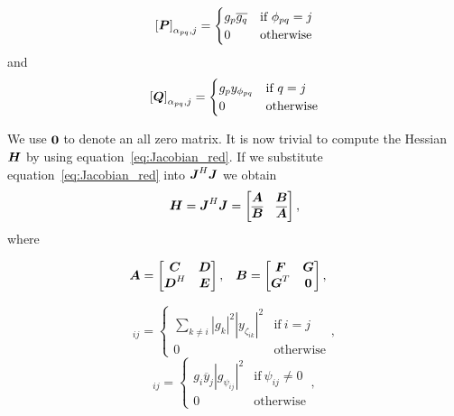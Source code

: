 \documentclass[useAMS,usenatbib]{mn2e}
\newcommand{\bA}{\bmath{A}}
\newcommand{\bB}{\bmath{B}}
\newcommand{\bC}{\bmath{C}}
\newcommand{\bE}{\bmath{E}}
\newcommand{\bF}{\bmath{F}}
\newcommand{\bG}{\bmath{G}}
\newcommand{\bJ}{\bmath{J}}
\newcommand{\bD}{\bmath{D}}
\newcommand{\bH}{\bmath{H}}
\newcommand{\bP}{\bmath{P}}
\newcommand{\bQ}{\bmath{Q}}
\newcommand{\bzero}{\bmath{0}}
\newcommand{\conj}[1]{\overline{#1}}
\begin{document}
\begin{equation}
\left [ \bP  \right ]_{\alpha_{pq},j} = \begin{cases}
                                         g_p\conj{g_q} & \textrm{if}~\phi_{pq}=j\\
                                         0  & \textrm{otherwise} 
                                        \end{cases}
\end{equation}
and
\begin{equation}
\left [ \bQ  \right ]_{\alpha_{pq},j} = \begin{cases}
                                         g_py_{\phi_{pq}} & \textrm{if}~q=j\\
                                         0  & \textrm{otherwise} 
                                        \end{cases}
\end{equation}

We use $\bzero$ to denote an all zero matrix. It is now trivial to compute the Hessian $\bH$ by using equation~\ref{eq:Jacobian_red}. If we substitute equation~\ref{eq:Jacobian_red} into $\bJ^H\bJ$
we obtain 
\begin{equation}
\label{eq:red_H}
\bH = \bJ^H\bJ = 
\begin{bmatrix}
\bA & \bB\\
\conj{\bB} & \conj{\bA}
\end{bmatrix},
\end{equation}
where

\begin{align}
\bA &= \begin{bmatrix} \bC & \bD\\ \bD^H & \bE \end{bmatrix}, & \bB &= \begin{bmatrix} \bF & \bG\\ \bG^T & \bzero \end{bmatrix},
\end{align}

\begin{equation}
[\bC]_{ij} = 
\begin{cases}
 \sum_{k \neq i} \left | g_k \right |^2 \left | y_{\zeta_{ik}} \right |^2 & \textrm{if} ~ i=j\\
 0 & \textrm{otherwise}
\end{cases},
\end{equation}
\begin{equation}
[\bD]_{ij} = 
\begin{cases}
 g_i \conj{y}_j  \left | g_{\psi_{ij}} \right |^2  & \textrm{if} ~ \psi_{ij}\neq0\\
 0 & \textrm{otherwise}
\end{cases},
\end{equation}
\end{document}
